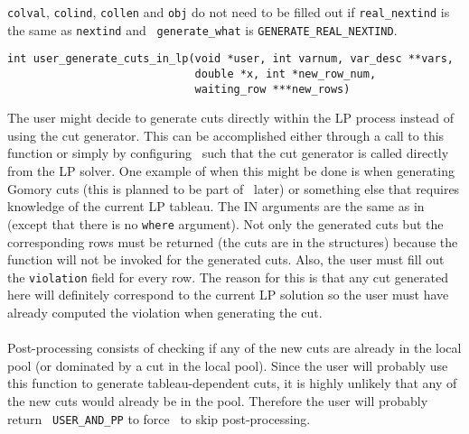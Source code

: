 \item[Note:] \hfill

{\tt colval}, {\tt colind}, {\tt collen} and {\tt obj} do not need to
be filled out if {\tt real\_nextind} is the same as {\tt nextind} and {\tt
generate\_what} is {\tt GENERATE\_REAL\_NEXTIND}.

\ed
\vspace{1ex}


\begin{verbatim}
int user_generate_cuts_in_lp(void *user, int varnum, var_desc **vars, 
                             double *x, int *new_row_num, 
                             waiting_row ***new_rows)
\end{verbatim}

\bd
\describe

The user might decide to generate cuts directly within the LP process
instead of using the cut generator. This can be accomplished either
through a call to this function or simply by configuring \BB\ such
that the cut generator is called directly from the LP solver. One
example of when this might be done is when generating Gomory cuts
(this is planned to be part of \BB\ later) or something else that
requires knowledge of the current LP tableau. The IN arguments are the
same as in {\tt 
{}} (except
that there is no {\tt where} argument). Not only the generated cuts
but the corresponding rows must be returned (the cuts are in the
{\tt {}} structures) because the {\tt
{}}
function will not be invoked for the generated cuts. Also, the user
must fill out the {\tt violation} field for every row. The reason for
this is that any cut generated here will definitely correspond to the
current LP solution so the user must have already computed the
violation when generating the cut.\\
\\
Post-processing consists of checking if any of the new cuts are
already in the local pool (or dominated by a cut in the local pool).
Since the user will probably use this function to generate
tableau-dependent cuts, it is highly unlikely that any of the new cuts would
already be in the pool. Therefore the user will probably return {\tt
USER\_AND\_PP} to force \BB\ to skip post-processing.

